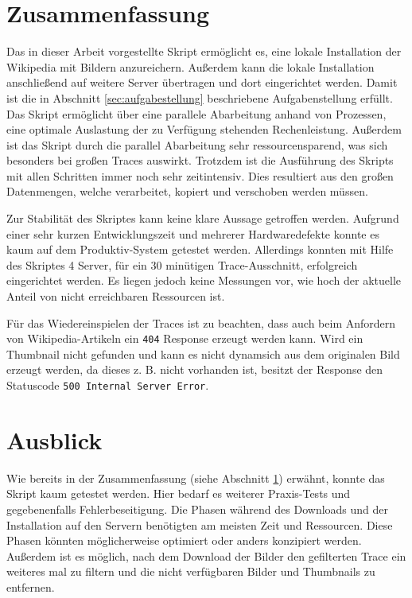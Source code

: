 \section{Zusammenfassung}
\label{sec:zusammenfassung}

Das in dieser Arbeit vorgestellte Skript ermöglicht es, eine lokale Installation der Wikipedia mit Bildern anzureichern. Außerdem kann die lokale Installation anschließend auf weitere Server übertragen und dort eingerichtet werden. Damit ist die in Abschnitt \ref{sec:aufgabestellung} beschriebene Aufgabenstellung erfüllt. Das Skript ermöglicht über eine parallele Abarbeitung anhand von Prozessen, eine optimale Auslastung der zu Verfügung stehenden Rechenleistung. Außerdem ist das Skript durch die parallel Abarbeitung sehr ressourcensparend, was sich besonders bei großen Traces auswirkt. Trotzdem ist die Ausführung des Skripts mit allen Schritten immer noch sehr zeitintensiv. Dies resultiert aus den großen Datenmengen, welche verarbeitet, kopiert und verschoben werden müssen. 

Zur Stabilität des Skriptes kann keine klare Aussage getroffen werden. Aufgrund einer sehr kurzen Entwicklungszeit und mehrerer Hardwaredefekte konnte es kaum auf dem Produktiv-System getestet werden. Allerdings konnten mit Hilfe des Skriptes 4 Server, für ein 30 minütigen Trace-Ausschnitt, erfolgreich eingerichtet werden. Es liegen jedoch keine Messungen vor, wie hoch der aktuelle Anteil von nicht erreichbaren Ressourcen ist.

Für das Wiedereinspielen der Traces ist zu beachten, dass auch beim Anfordern von Wikipedia-Artikeln ein \texttt{404} Response erzeugt werden kann.
Wird ein Thumbnail nicht gefunden und kann es nicht dynamsich aus dem originalen Bild erzeugt werden, da dieses z. B. nicht vorhanden ist, besitzt der Response den Statuscode \texttt{500 Internal Server Error}.

\section{Ausblick}
\label{sec:ausblick}

Wie bereits in der Zusammenfassung (siehe Abschnitt \ref{sec:zusammenfassung}) erwähnt, konnte das Skript kaum getestet werden. Hier bedarf es weiterer Praxis-Tests und gegebenenfalls Fehlerbeseitigung. Die Phasen während des Downloads und der Installation auf den Servern benötigten am meisten Zeit und Ressourcen. Diese Phasen könnten möglicherweise optimiert oder anders konzipiert werden. Außerdem ist es möglich, nach dem Download der Bilder den gefilterten Trace ein weiteres mal zu filtern und die nicht verfügbaren Bilder und Thumbnails zu entfernen.




